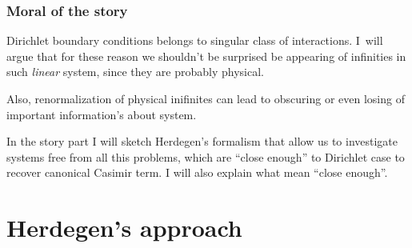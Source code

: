 \documentclass[10pt,t]{beamer}
\begin{document}
\begin{frame}
  \frametitle{Moral of the story}


  Dirichlet boundary conditions belongs to singular class of
  interactions. I~will argue that for these reason we shouldn't be
  surprised be appearing of infinities in such \textit{linear} system,
  since they are probably physical.

  Also, renormalization of physical inifinites can lead to obscuring
  or even losing of important information's about system.

  In the story part I will sketch Herdegen's formalism that allow us
  to investigate systems free from all this problems, which are
  ``close enough'' to Dirichlet case to recover canonical Casimir
  term. I will also explain what mean ``close enough''.

\end{frame}










\section{Herdegen's approach}
\end{document}
